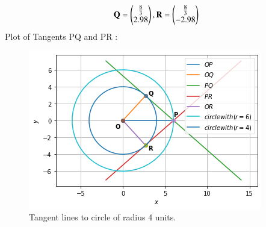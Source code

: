 \documentclass[journal,12pt,twocolumn]{IEEEtran}
\begin{document}
\begin{align}
\mathbf{Q}=\begin{pmatrix}\frac{8}{3}\\2.98\end{pmatrix},
\mathbf{R}=\begin{pmatrix}\frac{8}{3}\\-2.98\end{pmatrix}
\end{align}
Plot of Tangents PQ and PR :
\begin{figure}[ht]
    \centering
    \includegraphics[width=\columnwidth]{TANGENT.png}
    \caption{Tangent lines to circle of radius 4 units.}
    \label{fig:Tangent lines to circle of radius 4 units.}
\end{figure}    
\end{document}
